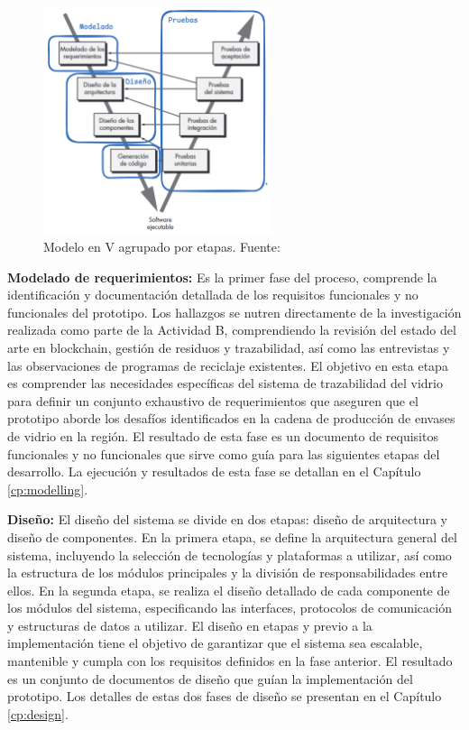 \begin{figure}[!htb]
	\centering
	\includegraphics[width=0.6\textwidth]{Figures/model-v-grouped.png}
	\caption{Modelo en V agrupado por etapas. Fuente: \cite{pressman2010ingenieria}}
    \label{fig:methodology-v-grouped}
\end{figure}


\textbf{Modelado de requerimientos:}
Es la primer fase del proceso, comprende la identificación y documentación detallada de los requisitos funcionales y no funcionales del prototipo.
Los hallazgos se nutren directamente de la investigación realizada como parte de la Actividad B, comprendiendo la revisión del estado del arte en blockchain, gestión de residuos y trazabilidad, así como las entrevistas y las observaciones de programas de reciclaje existentes.
El objetivo en esta etapa es comprender las necesidades específicas del sistema de trazabilidad del vidrio para definir un conjunto exhaustivo de requerimientos que aseguren que el prototipo aborde los desafíos identificados en la cadena de producción de envases de vidrio en la región.
El resultado de esta fase es un documento de requisitos funcionales y no funcionales que sirve como guía para las siguientes etapas del desarrollo.
La ejecución y resultados de esta fase se detallan en el Capítulo \ref{cp:modelling}.

\textbf{Diseño:}
El diseño del sistema se divide en dos etapas: diseño de arquitectura y diseño de componentes.
En la primera etapa, se define la arquitectura general del sistema, incluyendo la selección de tecnologías y plataformas a utilizar, así como la estructura de los módulos principales y la división de responsabilidades entre ellos.
En la segunda etapa, se realiza el diseño detallado de cada componente de los módulos del sistema, especificando las interfaces, protocolos de comunicación y estructuras de datos a utilizar.
El diseño en etapas y previo a la implementación tiene el objetivo de garantizar que el sistema sea escalable, mantenible y cumpla con los requisitos definidos en la fase anterior.
El resultado es un conjunto de documentos de diseño que guían la implementación del prototipo.
Los detalles de estas dos fases de diseño se presentan en el Capítulo \ref{cp:design}.

